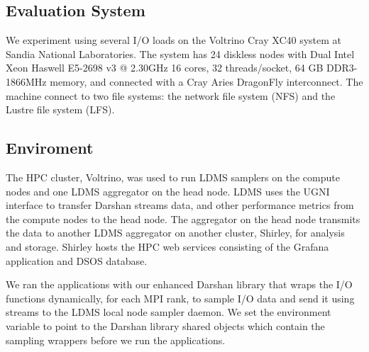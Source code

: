 \subsection{Evaluation System}
We experiment using several I/O loads on the Voltrino Cray XC40 system at Sandia National Laboratories. The system has 24  diskless nodes with Dual Intel Xeon Haswell E5-2698 v3 @ 2.30GHz 16 cores, 32 threads/socket, 64 GB DDR3-1866MHz memory, and connected with a Cray Aries DragonFly interconnect. The machine connect to two file systems: the network file system (NFS) and the Lustre file system (LFS).

\subsection{Enviroment}
The HPC cluster, Voltrino, was used to run LDMS samplers on the compute nodes and one LDMS aggregator on the head node. LDMS uses the UGNI interface to transfer Darshan streams data, and other performance metrics from the compute nodes to the head node. The aggregator on the head node transmits the data to another LDMS aggregator on another cluster, Shirley, for analysis and storage. Shirley hosts the HPC web services consisting of the Grafana application and DSOS database. 

We ran the applications with our enhanced Darshan library that wraps the I/O functions dynamically, for each MPI rank, to sample I/O data and send it using streams to the LDMS local node sampler daemon. We set the  environment variable to point to the Darshan library shared objects which contain the sampling wrappers before we run the applications.



		
%


